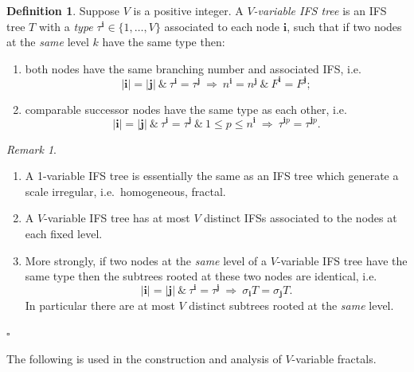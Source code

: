 \documentclass[a4paper]{amsart}
\theoremstyle{plain}
\theoremstyle{definition}
\newtheorem{definition}[theorem]{Definition}%
\theoremstyle{remark}
\newtheorem{remark}[theorem]{Remark}
\begin{document}
\begin{definition} \label{dfVt}
Suppose $ V $ is a positive integer.   A  \emph{$ V $-variable IFS tree} is an IFS tree $ T $ with a \emph{type} $ \tau  ^{ \boldsymbol{i} } \in \{1,\dots, V \} $ associated to each node $ \boldsymbol{i} $, such that  if two nodes at the \emph{same} level $ k $  have the same type then:
\begin{enumerate}
\item   both nodes have the same branching number and   associated IFS, i.e.
\[ 
 |\boldsymbol{i} | = | \boldsymbol{j} | \ \&\ \tau ^{\boldsymbol{i}}= \tau ^{\boldsymbol{j} }
 \    \Longrightarrow \ n^ { \boldsymbol{i} } = n^ { \boldsymbol{j} }  \ \& \ F^ { \boldsymbol{i} } = F^ { \boldsymbol{j} } ;
     \]
    
    \item   comparable successor nodes   have the same type as each other, i.e.
    \[
 |\boldsymbol{i} | = | \boldsymbol{j} | \ \&\ \tau ^{\boldsymbol{i}}= \tau ^{\boldsymbol{j} }
\ \&\ 1 \leq p \leq  n^ { \boldsymbol{i} }  \  \Longrightarrow \ 
\tau ^{ \boldsymbol{i}  p } =   \tau ^{ \boldsymbol{j}  p } .
\]
    \end{enumerate} 
\end{definition}     
    
\begin{remark} \mbox{}

    \begin{enumerate}
 \item A  1-variable IFS tree  is essentially the same as an IFS tree  which generate a scale irregular, i.e.\ homogeneous, fractal.
    \item   A $ V $-variable IFS tree  has at most $  V $ distinct IFSs associated to the nodes at each fixed level.
    \item More strongly, if two nodes at the \emph{same} level  of  a $ V $-variable IFS tree have the same type then the subtrees rooted at these two nodes are identical, i.e.\
    \[
 | \boldsymbol{i} | = | \boldsymbol{j}  |
  \ \&\ \tau ^{\boldsymbol{i}}= \tau ^{\boldsymbol{j} }
  \  \Longrightarrow\  \sigma _{ \boldsymbol{i} } T = \sigma _ { \boldsymbol{j} } T .
 \]
In particular there are at most $ V $ distinct subtrees rooted at the \emph{same} level.
 \end{enumerate} 
\hfill $\square$  \end{remark}  

The following is used in the construction and analysis of $ V $-variable fractals.
\end{document}

